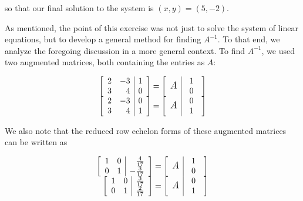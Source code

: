 \documentclass{ximera}
\begin{document}
so that our final solution to the system is $(x,y) = (5,-2)$.   

\smallskip

As mentioned, the point of this exercise was not just to solve the system of linear equations, but to develop a general method for finding $A^{-1}$.  To that end, we analyze the foregoing discussion in a more general context. To find $A^{-1}$, we used two augmented matrices, both containing the entries as $A$:

\[ \begin{array}{rcl}

\left[
\begin{array}{rr|r}
2 & -3 & 1 \\
3 & 4 & 0
\end{array}
\right]
=
\left[
\begin{array}{c|c}
{\large\textit{A}} &
\begin{array}{r}
1\\
0
\end{array}
\end{array}
\right]
\\

\left[
\begin{array}{rr|r}
2 & -3 & 0 \\
3 & 4 & 1
\end{array}
\right]
=
\left[
\begin{array}{c|c}
{\large\textit{A}} &
\begin{array}{r}
0\\
1
\end{array}
\end{array}
\right]
\end{array} \]


We also note that the reduced row echelon forms of these augmented matrices can be written as

\[ \begin{array}{rcl}

\left[
\begin{array}{rr|r}
1 & 0 & \frac{4}{17} \\
0 & 1 & -\frac{3}{17}
\end{array}
\right]
=
\left[
\begin{array}{c|c}
{\large\textit{A}} &
\begin{array}{r}
1\\
0
\end{array}
\end{array}
\right]
\\

\left[
\begin{array}{rr|r}
1 & 0 & \frac{3}{17} \\
0 & 1 & \frac{2}{17}
\end{array}
\right]
=
\left[
\begin{array}{c|c}
{\large\textit{A}} &
\begin{array}{r}
0\\
1
\end{array}
\end{array}
\right]
\end{array} \]
\end{document}
